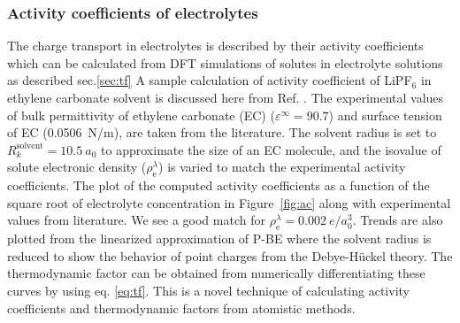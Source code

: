 \documentclass[journal=jacsat,manuscript=article]{achemso}
\newcommand*{\dens}{\rho}
\newcommand*{\denselec}{\dens_{\textrm{e}}}
\newcommand*{\acc}{\lambda}
\newcommand*{\eps}{\varepsilon}
\begin{document}
\subsubsection{Activity coefficients of electrolytes}
The charge transport in electrolytes is described by their activity coefficients which can be calculated from DFT simulations of solutes in electrolyte solutions as described sec.\ref{sec:tf} A sample calculation of activity coefficient of LiPF$_6$ in ethylene carbonate solvent is discussed here from Ref. . The experimental values of bulk permittivity of ethylene carbonate (EC) ($\eps^\infty=90.7$)\cite{Hall2015} and surface tension of EC (0.0506~N/m),\cite{Naejus2002} are taken from the literature. The solvent radius is set to $R^\textrm{solvent}_k= 10.5~a_0$ to approximate the size of an EC molecule, and the isovalue of solute electronic density ($\denselec^\acc$) is varied to match the experimental activity coefficients. The plot of the computed activity coefficients as a function of the square root of electrolyte concentration in Figure~\ref{fig:ac} along with experimental values from literature.\cite{Stewart2008} We see a good match for $\denselec^\acc=0.002~e/a_0^3$. Trends are also plotted from the linearized approximation of P-BE where the solvent radius is reduced to show the behavior of point charges from the Debye-H\"uckel theory.\cite{debye1923theory} The thermodynamic factor can be obtained from numerically differentiating these curves by using eq. \eqref{eq:tf}. This is a novel technique of calculating activity coefficients and thermodynamic factors from atomistic methods.
\end{document}
